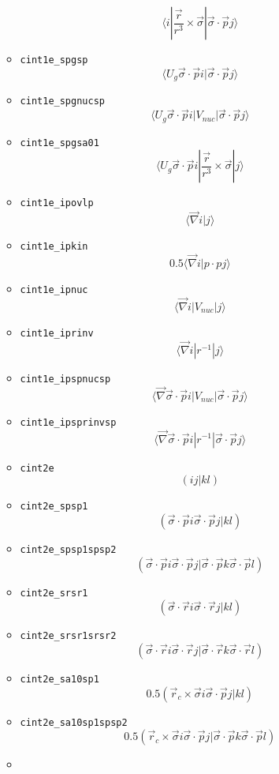 \documentclass[]{article}
\begin{document}
\begin{itemize}
\begin{itemize}
    \[\langle i| \frac{\vec{r}}{r^3} \times\vec{\sigma} | \vec{\sigma}\cdot\vec{p}j\rangle \]
  \item
    \texttt{cint1e\_spgsp}
    \[\langle U_g \vec{\sigma}\cdot\vec{p} i| \vec{\sigma}\cdot\vec{p}j\rangle \]
  \item
    \texttt{cint1e\_spgnucsp}
    \[\langle U_g \vec{\sigma}\cdot\vec{p} i| V_{nuc} | \vec{\sigma}\cdot\vec{p}j\rangle \]
  \item
    \texttt{cint1e\_spgsa01}
    \[\langle U_g \vec{\sigma}\cdot\vec{p} i| \frac{\vec{r}}{r^3} \times\vec{\sigma} |j\rangle \]
  \item
    \texttt{cint1e\_ipovlp} \[\langle \vec{\nabla} i|j\rangle \]
  \item
    \texttt{cint1e\_ipkin}
    \[0.5\langle \vec{\nabla} i| p \cdot pj\rangle \]
  \item
    \texttt{cint1e\_ipnuc} \[\langle \vec{\nabla} i| V_{nuc}|j\rangle \]
  \item
    \texttt{cint1e\_iprinv} \[\langle \vec{\nabla} i| r^{-1}|j\rangle \]
  \item
    \texttt{cint1e\_ipspnucsp}
    \[\langle \vec{\nabla} \vec{\sigma}\cdot\vec{p} i| V_{nuc}| \vec{\sigma}\cdot\vec{p}j\rangle \]
  \item
    \texttt{cint1e\_ipsprinvsp}
    \[\langle \vec{\nabla} \vec{\sigma}\cdot\vec{p} i| r^{-1}| \vec{\sigma}\cdot\vec{p}j\rangle \]
  \item
    \texttt{cint2e} \[(ij|kl)\]
  \item
    \texttt{cint2e\_spsp1}
    \[(\vec{\sigma}\cdot\vec{p} i \vec{\sigma}\cdot\vec{p} j| k l)\]
  \item
    \texttt{cint2e\_spsp1spsp2}
    \[(\vec{\sigma}\cdot\vec{p} i \vec{\sigma}\cdot\vec{p} j| \vec{\sigma}\cdot\vec{p} k \vec{\sigma}\cdot\vec{p} l)\]
  \item
    \texttt{cint2e\_srsr1}
    \[(\vec{\sigma}\cdot\vec{r} i \vec{\sigma}\cdot\vec{r} j| kl)\]
  \item
    \texttt{cint2e\_srsr1srsr2}
    \[(\vec{\sigma}\cdot\vec{r} i \vec{\sigma}\cdot\vec{r} j| \vec{\sigma}\cdot\vec{r} k \vec{\sigma}\cdot\vec{r}l)\]
  \item
    \texttt{cint2e\_sa10sp1}
    \[0.5 (\vec{r}_c \times\vec{\sigma} i \vec{\sigma}\cdot\vec{p} j| kl)\]
  \item
    \texttt{cint2e\_sa10sp1spsp2}
    \[0.5 (\vec{r}_c \times\vec{\sigma} i \vec{\sigma}\cdot\vec{p} j| \vec{\sigma}\cdot\vec{p} k \vec{\sigma}\cdot\vec{p} l)\]
  \item

\end{itemize}
\end{itemize}
\end{document}
